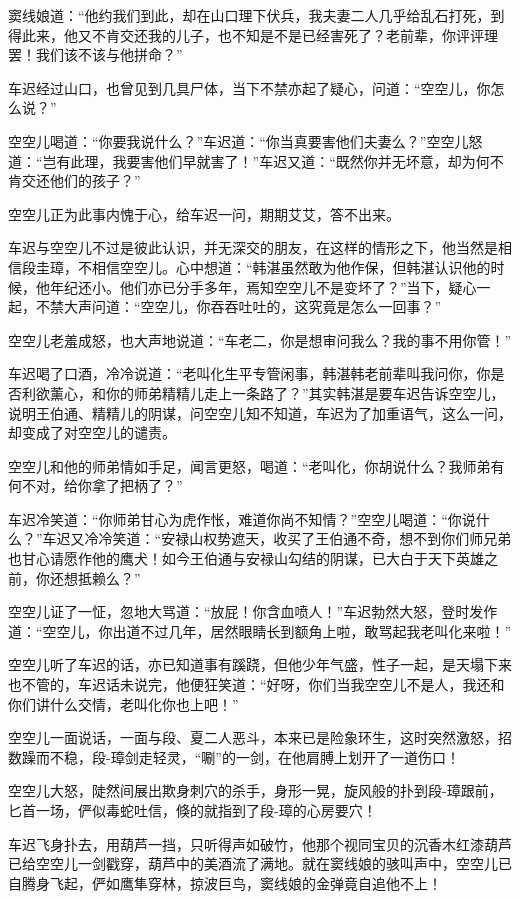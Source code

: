 \documentclass[12pt,oneside]{book}
\begin{document}
窦线娘道：``他约我们到此，却在山口理下伏兵，我夫妻二人几乎给乱石打死，到得此来，他又不肯交还我的儿子，也不知是不是已经害死了？老前辈，你评评理罢！我们该不该与他拼命？''

车迟经过山口，也曾见到几具尸体，当下不禁亦起了疑心，问道：``空空儿，你怎么说？''

空空儿喝道：``你要我说什么？''车迟道：``你当真要害他们夫妻么？''空空儿怒道：``岂有此理，我要害他们早就害了！''车迟又道：``既然你并无坏意，却为何不肯交还他们的孩子？''

空空儿正为此事内愧于心，给车迟一问，期期艾艾，答不出来。

车迟与空空儿不过是彼此认识，并无深交的朋友，在这样的情形之下，他当然是相信段圭璋，不相信空空儿。心中想道：``韩湛虽然敢为他作保，但韩湛认识他的时候，他年纪还小。他们亦已分手多年，焉知空空儿不是变坏了？''当下，疑心一起，不禁大声问道：``空空儿，你吞吞吐吐的，这究竟是怎么一回事？''

空空儿老羞成怒，也大声地说道：``车老二，你是想审问我么？我的事不用你管！''

车迟喝了口酒，冷冷说道：``老叫化生平专管闲事，韩湛韩老前辈叫我问你，你是否利欲薰心，和你的师弟精精儿走上一条路了？''其实韩湛是要车迟告诉空空儿，说明王伯通、精精儿的阴谋，问空空儿知不知道，车迟为了加重语气，这么一问，却变成了对空空儿的谴责。

空空儿和他的师弟情如手足，闻言更怒，喝道：``老叫化，你胡说什么？我师弟有何不对，给你拿了把柄了？''

车迟冷笑道：``你师弟甘心为虎作怅，难道你尚不知情？''空空儿喝道：``你说什么？''车迟又冷冷笑道：``安禄山权势遮天，收买了王伯通不奇，想不到你们师兄弟也甘心请愿作他的鹰犬！如今王伯通与安禄山勾结的阴谋，已大白于天下英雄之前，你还想抵赖么？''

空空儿证了一怔，忽地大骂道：``放屁！你含血喷人！''车迟勃然大怒，登时发作道：``空空儿，你出道不过几年，居然眼睛长到额角上啦，敢骂起我老叫化来啦！''

空空儿听了车迟的话，亦已知道事有蹊跷，但他少年气盛，性子一起，是天塌下来也不管的，车迟话未说完，他便狂笑道：``好呀，你们当我空空儿不是人，我还和你们讲什么交情，老叫化你也上吧！''

空空儿一面说话，一面与段、夏二人恶斗，本来已是险象环生，这时突然激怒，招数躁而不稳，段-璋剑走轻灵，``唰''的一剑，在他肩膊上划开了一道伤口！

空空儿大怒，陡然间展出欺身刺穴的杀手，身形一晃，旋风般的扑到段-璋跟前，匕首一场，俨似毒蛇吐信，倏的就指到了段-璋的心房要穴！

车迟飞身扑去，用葫芦一挡，只听得声如破竹，他那个视同宝贝的沉香木红漆葫芦已给空空儿一剑戳穿，葫芦中的美酒流了满地。就在窦线娘的骇叫声中，空空儿已自腾身飞起，俨如鹰隼穿林，掠波巨鸟，窦线娘的金弹竟自追他不上！
\end{document}
